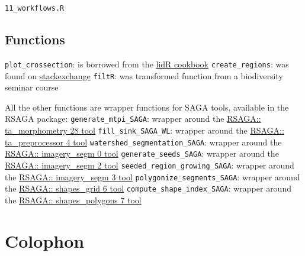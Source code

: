\documentclass[
  12pt,
]{article}
\begin{document}
\texttt{11\_workflows.R}

\hypertarget{functions}{%
\subsection{Functions}\label{functions}}

\texttt{plot\_crossection}: is borrowed from the \href{https://jean-romain.github.io/lidRbook/io.html\#plot}{lidR cookbook}
\newline
\texttt{create\_regions}: was found on \href{https://gis.stackexchange.com/questions/79114/joining-nearest-neighbor-small-polygons-using-r}{stackexchange}
\newline
\texttt{filtR}: was transformed function from a biodiversity seminar course

All the other functions are wrapper functions for SAGA tools, available in the RSAGA package:
\newline
\texttt{generate\_mtpi\_SAGA}: wrapper around the \href{http://www.saga-gis.org/saga_tool_doc/7.9.1/ta_morphometry_28.html}{RSAGA:: ta\_morphometry 28 tool}
\newline
\texttt{fill\_sink\_SAGA\_WL}: wrapper around the \href{http://www.saga-gis.org/saga_tool_doc/7.9.1/ta_preprocessor_4.html}{RSAGA:: ta\_preprocessor 4 tool}
\newline
\texttt{watershed\_segmentation\_SAGA}: wrapper around the \href{http://www.saga-gis.org/saga_tool_doc/7.9.1/imagery_segmentation_0.html}{RSAGA:: imagery\_segm 0 tool}
\newline
\texttt{generate\_seeds\_SAGA}: wrapper around the \href{http://www.saga-gis.org/saga_tool_doc/7.9.1/imagery_segmentation_2.html}{RSAGA:: imagery\_segm 2 tool}
\newline
\texttt{seeded\_region\_growing\_SAGA}: wrapper around the \href{http://www.saga-gis.org/saga_tool_doc/7.9.1/imagery_segmentation_3.html}{RSAGA:: imagery\_segm 3 tool}
\newline
\texttt{polygonize\_segments\_SAGA}: wrapper around the \href{http://www.saga-gis.org/saga_tool_doc/7.9.1/shapes_grid_6.html}{RSAGA:: shapes\_grid 6 tool}
\newline
\texttt{compute\_shape\_index\_SAGA}: wrapper around the \href{http://www.saga-gis.org/saga_tool_doc/7.9.1/shapes_polygons_7.html}{RSAGA:: shapes\_polygons 7 tool}

\newpage

\hypertarget{colophon}{%
\section{Colophon}\label{colophon}}
\end{document}
